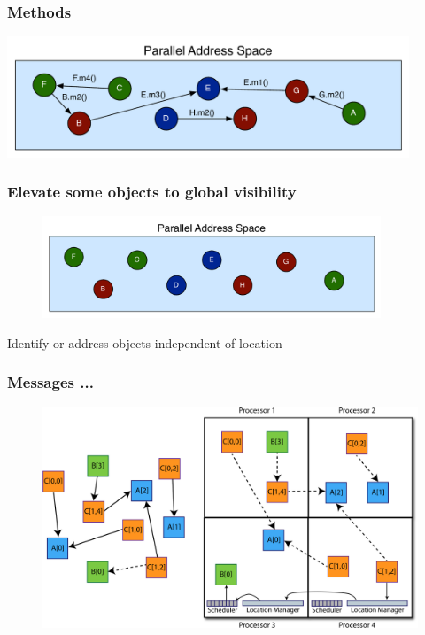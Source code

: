 \begin{frame}
  \frametitle{Methods}
  \begin{center}\includegraphics[width=0.9\textwidth]{../figures/objectMethodGlobalAddress.pdf}\end{center}
\end{frame}


\begin{frame}
  \frametitle{Elevate some objects to global visibility}
  \begin{figure}\includegraphics[width=0.9\textwidth]{../figures/objectGlobalAddress.pdf}\end{figure}
  \pause
  \begin{block}{}
  Identify or address objects independent of location
  \end{block}
\end{frame}


\begin{frame}
  \frametitle{Messages ...
  }
  \begin{figure}
  \includegraphics[trim=0in 0in 14in 2in, clip=true, height=0.85\textheight]{../figures/elements2.pdf}
  \end{figure}
\end{frame}



